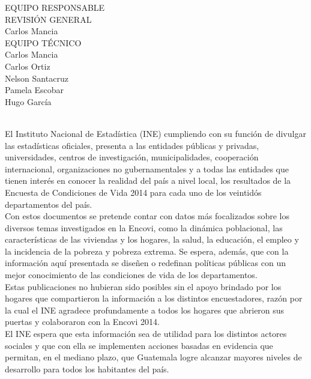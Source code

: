 $\ $
\vspace{1cm}

\begin{center}
	{\Bold \LARGE EQUIPO RESPONSABLE}\\[2cm]
	
	{\Bold \large \color{color1!89!black} REVISIÓN GENERAL}\\[0.2cm]
	Carlos Mancia\\[0.8cm]
	
	
	{\Bold \large \color{color1!89!black} EQUIPO TÉCNICO}\\[0.2cm]
	Carlos Mancia\\
	Carlos Ortiz\\
	Nelson Santacruz \\
	Pamela Escobar\\
	Hugo García \\[0.8cm]
\end{center}


\cleardoublepage
$\ $\\[2cm]
\\[2cm]
El Instituto Nacional de Estadística (INE) cumpliendo con su función de divulgar las estadísticas oficiales, presenta a las entidades públicas y privadas, universidades, centros de investigación, municipalidades, cooperación internacional, organizaciones no gubernamentales y a todas las entidades que tienen interés en conocer la realidad del país a nivel local, los resultados de la Encuesta de Condiciones de Vida 2014 para cada uno de los veintidós departamentos del país.\\

Con estos documentos se pretende contar con datos más focalizados sobre los diversos temas investigados en la Encovi, como la dinámica poblacional, las características de las viviendas y los hogares, la salud, la educación, el empleo y la incidencia de la pobreza y pobreza extrema. Se espera, además, que con la información aquí presentada se diseñen o redefinan políticas públicas con un mejor conocimiento de las condiciones de vida de los departamentos.\\

Estas publicaciones no hubieran sido posibles sin el apoyo brindado por los hogares que compartieron la información a los distintos encuestadores, razón por la cual el INE agradece profundamente a todos los hogares que abrieron sus puertas y colaboraron con la Encovi 2014.\\

El INE espera que esta información sea de utilidad para los distintos actores sociales y que con ella se implementen acciones basadas en evidencia que permitan, en el mediano plazo, que Guatemala logre alcanzar mayores niveles de desarrollo para todos los habitantes del país.

\cleardoublepage
